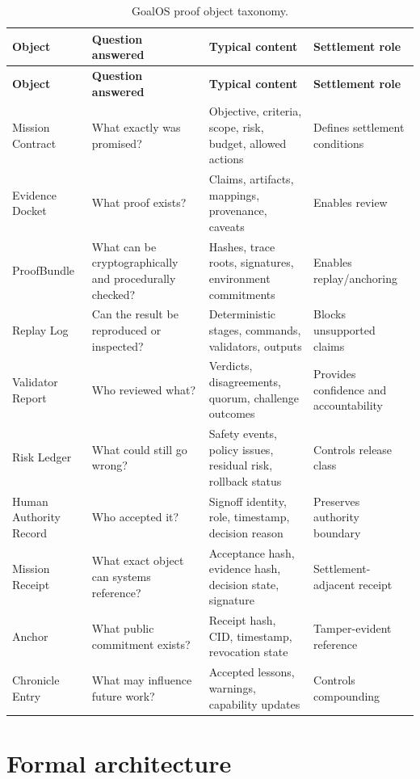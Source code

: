 \documentclass[11pt]{article}
\begin{document}
\begin{longtable}{p{} p{} p{} p{}}
\caption{GoalOS proof object taxonomy.}\label{tab:taxonomy}\\
\toprule
\textbf{Object} & \textbf{Question answered} & \textbf{Typical content} & \textbf{Settlement role}\\
\midrule
\endfirsthead
\toprule
\textbf{Object} & \textbf{Question answered} & \textbf{Typical content} & \textbf{Settlement role}\\
\midrule
\endhead
Mission Contract & What exactly was promised? & Objective, criteria, scope, risk, budget, allowed actions & Defines settlement conditions \\
Evidence Docket & What proof exists? & Claims, artifacts, mappings, provenance, caveats & Enables review \\
ProofBundle & What can be cryptographically and procedurally checked? & Hashes, trace roots, signatures, environment commitments & Enables replay/anchoring \\
Replay Log & Can the result be reproduced or inspected? & Deterministic stages, commands, validators, outputs & Blocks unsupported claims \\
Validator Report & Who reviewed what? & Verdicts, disagreements, quorum, challenge outcomes & Provides confidence and accountability \\
Risk Ledger & What could still go wrong? & Safety events, policy issues, residual risk, rollback status & Controls release class \\
Human Authority Record & Who accepted it? & Signoff identity, role, timestamp, decision reason & Preserves authority boundary \\
Mission Receipt & What exact object can systems reference? & Acceptance hash, evidence hash, decision state, signature & Settlement-adjacent receipt \\
Anchor & What public commitment exists? & Receipt hash, CID, timestamp, revocation state & Tamper-evident reference \\
Chronicle Entry & What may influence future work? & Accepted lessons, warnings, capability updates & Controls compounding \\
\bottomrule
\end{longtable}

\section{Formal architecture}
\end{document}
